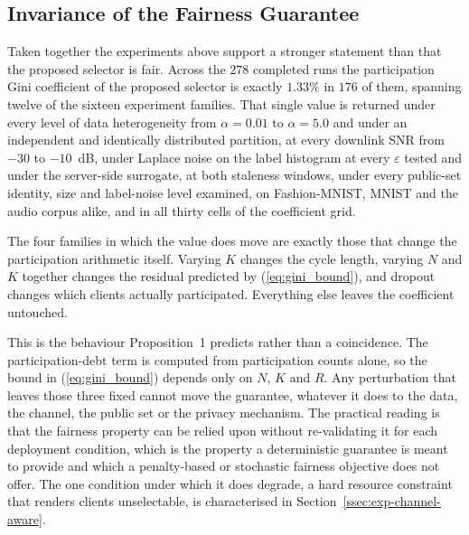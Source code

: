 \documentclass[journal]{IEEEtran}
\newcommand{\rev}[1]{#1}
\begin{document}
\rev{\subsection{Invariance of the Fairness Guarantee}
\label{ssec:exp-invariance}

Taken together the experiments above support a stronger statement than that the proposed selector is fair. Across the $278$ completed runs the participation Gini coefficient of the proposed selector is exactly $1.33\%$ in $176$ of them, spanning twelve of the sixteen experiment families. That single value is returned under every level of data heterogeneity from $\alpha = 0.01$ to $\alpha = 5.0$ and under an independent and identically distributed partition, at every downlink SNR from $-30$ to $-10$~dB, under Laplace noise on the label histogram at every $\varepsilon$ tested and under the server-side surrogate, at both staleness windows, under every public-set identity, size and label-noise level examined, on Fashion-MNIST, MNIST and the audio corpus alike, and in all thirty cells of the coefficient grid.

The four families in which the value does move are exactly those that change the participation arithmetic itself. Varying $K$ changes the cycle length, varying $N$ and $K$ together changes the residual predicted by (\ref{eq:gini_bound}), and dropout changes which clients actually participated. Everything else leaves the coefficient untouched.

This is the behaviour Proposition~1 predicts rather than a coincidence. The participation-debt term is computed from participation counts alone, so the bound in (\ref{eq:gini_bound}) depends only on $N$, $K$ and $R$. Any perturbation that leaves those three fixed cannot move the guarantee, whatever it does to the data, the channel, the public set or the privacy mechanism. The practical reading is that the fairness property can be relied upon without re-validating it for each deployment condition, which is the property a deterministic guarantee is meant to provide and which a penalty-based or stochastic fairness objective does not offer. The one condition under which it does degrade, a hard resource constraint that renders clients unselectable, is characterised in Section~\ref{ssec:exp-channel-aware}.}

\end{document}
